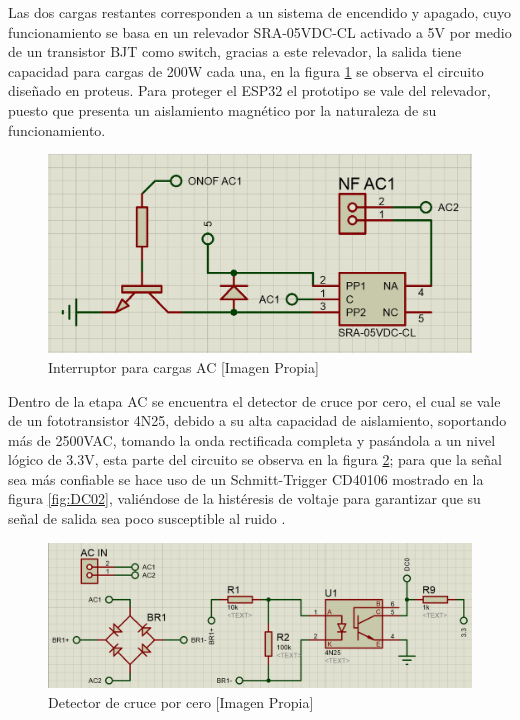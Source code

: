 		Las dos cargas restantes corresponden a un sistema de encendido y apagado, cuyo funcionamiento se basa en un relevador SRA-05VDC-CL activado a 5V por medio de un transistor BJT como switch, gracias a este relevador, la salida tiene capacidad para cargas de 200W cada una, en la figura \ref{fig:ONOFAC} se observa el circuito diseñado en proteus. Para proteger el ESP32 el prototipo se vale del relevador, puesto que presenta un aislamiento magnético por la naturaleza de su funcionamiento.\\
	
		\begin{figure}[H]
			\centering
			\caption{Interruptor para cargas AC [Imagen Propia]}
			\label{fig:ONOFAC}
			\includegraphics[width=0.7\linewidth]{Imagenes/ONOFAC}
		\end{figure}
	
		Dentro de la etapa AC se encuentra el detector de cruce por cero, el cual se vale de un fototransistor 4N25, debido a su alta capacidad de aislamiento, soportando más de 2500VAC, tomando la onda rectificada completa y pasándola a un nivel lógico de 3.3V, esta parte del circuito se observa en la figura \ref{fig:DC01}; para que la señal sea más confiable se hace uso de un Schmitt-Trigger CD40106 mostrado en la figura \ref{fig:DC02}, valiéndose de la histéresis de voltaje para garantizar que su señal de salida sea poco susceptible al ruido \cite{DC0}.\\
		
		\begin{figure}[H]
			\centering
			\caption{Detector de cruce por cero [Imagen Propia]}
			\label{fig:DC01}
			\includegraphics[width=0.85\linewidth]{Imagenes/DC01}
		\end{figure}
	
